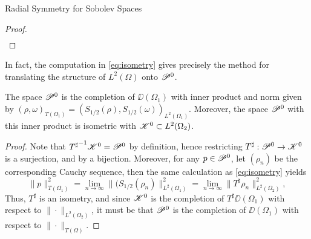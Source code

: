 \begin{chapter}{Radial Symmetry for Sobolev Spaces}
\begin{proof}
\begin{align}
\end{align}
\end{proof}
In fact, the computation in \eqref{eq:isometry} gives precisely the method for translating the structure of $L^2(\Omega)$ onto $\mathscr P^0$.
\begin{thm}
  The space $\mathscr P^0$ is the completion of $\DD(\Omega_1)$ with inner product and norm given by $(\rho,\omega)_{T(\Omega_1)} = \left( S_{1/2}(\rho),S_{1/2}(\omega) \right)_{L^2(\Omega_1)}$.
  Moreover, the space $\mathscr P^0$ with this inner product is isometric with $\mathscr K^0 \subset L^2(\Omega_2)$.
\end{thm}
\begin{proof}
  Note that ${T^\sharp}^{-1}\mathscr K^0 = \mathscr P^0$ by definition, hence restricting $T^\sharp: \mathscr P^0 \to \mathscr K^0$ is a surjection, and by  a bijection.
  Moreover, for any $p \in \mathscr P^0$, let $(\rho_n)$ be the corresponding Cauchy sequence, then the same calculation as \eqref{eq:isometry} yields 
  \begin{equation}
    \|p\|_{T(\Omega_1)}^2 = \lim_{n\to\infty} \|(S_{1/2}(\rho_n)\|^2_{L^2(\Omega_1)} = \lim_{n\to\infty} \|T^\sharp \rho_n \|^2_{L^2(\Omega_2)},
  \end{equation}
  Thus, $T^\sharp$ is an isometry, and since $\mathscr K^0$ is the completion of $T^\sharp \DD(\Omega_1)$ with respect to $\| \cdot \|_{L^2(\Omega_2)}$, it must be that $\mathscr P^0$ is the completion of $\DD(\Omega_1)$ with respect to $\|\cdot \|_{T(\Omega)}$.
\end{proof}


\end{chapter}
